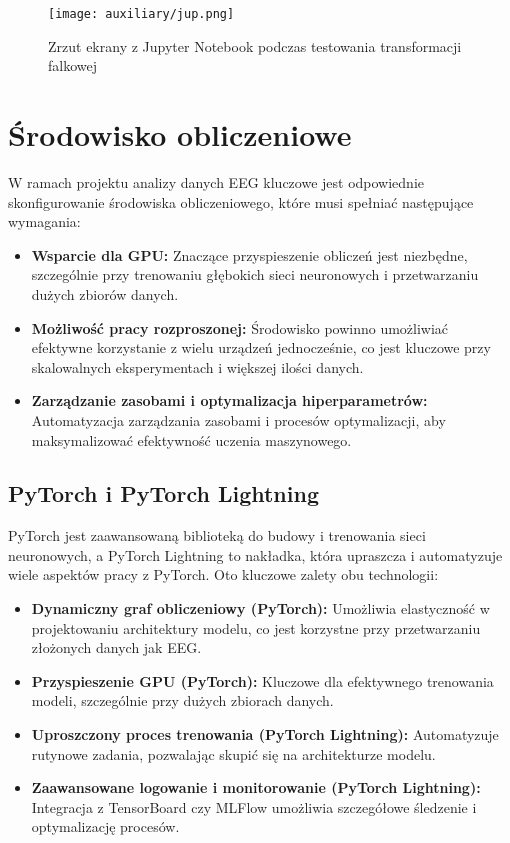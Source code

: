 \documentclass[12pt,twoside]{article}
\begin{document}
    \begin{figure}[ht]
        \centering
        \texttt{[image: auxiliary/jup.png]}
        \caption{Zrzut ekrany z Jupyter Notebook podczas testowania transformacji falkowej}
        \label{fig:jupyter_wavelet}
    \end{figure}


    \section{Środowisko obliczeniowe}
    W ramach projektu analizy danych EEG kluczowe jest odpowiednie skonfigurowanie środowiska obliczeniowego, które musi
    spełniać następujące wymagania:
    \begin{itemize}
        \item \textbf{Wsparcie dla GPU:}
        Znaczące przyspieszenie obliczeń jest niezbędne, szczególnie przy trenowaniu głębokich sieci neuronowych i
        przetwarzaniu dużych zbiorów danych.
        \item \textbf{Możliwość pracy rozproszonej:}
        Środowisko powinno umożliwiać efektywne korzystanie z wielu urządzeń jednocześnie, co jest kluczowe przy
        skalowalnych eksperymentach i większej ilości danych.
        \item \textbf{Zarządzanie zasobami i optymalizacja hiperparametrów:}
        Automatyzacja zarządzania zasobami i procesów optymalizacji, aby maksymalizować efektywność uczenia maszynowego.
    \end{itemize}

    \subsection{PyTorch i PyTorch Lightning}
    PyTorch jest zaawansowaną biblioteką do budowy i trenowania sieci neuronowych, a PyTorch Lightning to nakładka,
    która upraszcza i automatyzuje wiele aspektów pracy z PyTorch. Oto kluczowe zalety obu technologii:

    \begin{itemize}
        \item \textbf{Dynamiczny graf obliczeniowy (PyTorch):}
        Umożliwia elastyczność w projektowaniu architektury modelu, co jest korzystne przy przetwarzaniu złożonych
        danych jak EEG.
        \item \textbf{Przyspieszenie GPU (PyTorch):}
        Kluczowe dla efektywnego trenowania modeli, szczególnie przy dużych zbiorach danych.
        \item \textbf{Uproszczony proces trenowania (PyTorch Lightning):}
        Automatyzuje rutynowe zadania, pozwalając skupić się na architekturze modelu.
        \item \textbf{Zaawansowane logowanie i monitorowanie (PyTorch Lightning):}
        Integracja z TensorBoard czy MLFlow umożliwia szczegółowe śledzenie i optymalizację procesów.
    \end{itemize}
\end{document}
